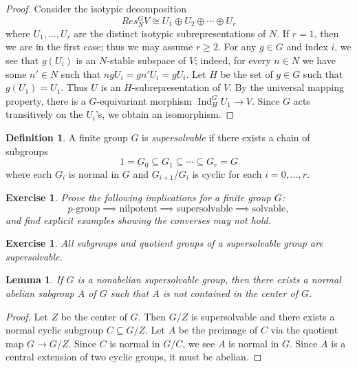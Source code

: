 \documentclass[12pt]{article}
\theoremstyle{plain}
\newtheorem{lemma}[theorem]{Lemma}
\newtheorem{exercise}[theorem]{Exercise}
\theoremstyle{definition}
\newtheorem{definition}[theorem]{Definition}
\theoremstyle{remark}
\numberwithin{equation}{section}
\begin{document}
\begin{proof}
Consider the isotypic decomposition
\[
Res^G_N V \cong U_1 \oplus U_2 \oplus \cdots \oplus U_r
\]
where $U_1, \ldots, U_r$ are the distinct isotypic subrepresentations of $N$.
If $r=1$, then we are in the first case; thus we may assume $r \ge 2$.
For any $g \in G$ and index $i$, we see that $g(U_i)$ is an $N$-stable
subspace of $V$; indeed, for every $n\in N$ we have some $n' \in N$
such that $ngU_i=gn'U_i=gU_i$.
Let $H$ be the set of $g \in G$ such that $g(U_1)=U_1$.
Thus $U$ is an $H$-subrepresentation of $V$.
By the universal mapping property, there is a $G$-equivariant
morphism $\operatorname{Ind}^G_H U_1 \to V$.
Since $G$ acts transitively on the $U_i$'s, we obtain an isomorphism.
\end{proof}

\begin{definition}
A finite group $G$ is \emph{supersolvable} if there exists a chain of
subgroups
\[
1=G_0 \subseteq G_1 \subseteq \cdots \subseteq G_r = G
\]
where each $G_i$ is normal in $G$ and $G_{i+1}/G_i$ is cyclic
for each $i=0,\ldots, r$. 
\end{definition}

\begin{exercise}
Prove the following implications for a finite group $G$:
\[
\textrm{$p$-group} \implies
\textrm{nilpotent} \implies \textrm{supersolvable} \implies
\textrm{solvable},
\]
and find explicit examples showing the converses may not hold.
\end{exercise}

\begin{exercise}
All subgroups and quotient groups of a supersolvable group are
supersolvable.
\end{exercise}

\begin{lemma} \label{lem:ss_abel}
If $G$ is a nonabelian supersolvable group, then there exists a normal
abelian subgroup $A$ of $G$ such that $A$ is not contained in the center
of $G$.
\end{lemma}

\begin{proof}
Let $Z$ be the center of $G$.  Then $G/Z$ is supersolvable and there
exists a normal cyclic subgroup $C \subseteq G/Z$.  Let $A$ be the
preimage of $C$ via the quotient map $G \to G/Z$.
Since $C$ is normal in $G/C$, we see $A$ is normal in $G$.
Since $A$ is a central extension of two cyclic groups, it must be
abelian.
\end{proof}
\end{document}
